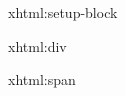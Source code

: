 
\startxmlsetups xhtml:setup-block
\stopxmlsetups


\startxmlsetups xhtml:div
\stopxmlsetups

\startxmlsetups xhtml:span
\stopxmlsetups


